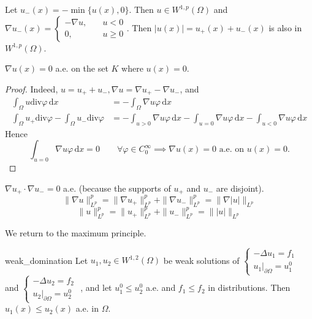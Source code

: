 \documentclass{report}
\begin{document}
\begin{corollary}{}{}
    Let \(u_{-}(x) = -\min\{u(x), 0\}\). Then \(u \in W^{1, p}(\Omega)\) and \(\nabla u_{-}(x) = \left\{\begin{aligned}
        -\nabla u, & \quad u < 0 \\
        0, & \quad u \geq 0
    \end{aligned}\right.\).
    Then \(\vert u(x) \vert = u_{+}(x) + u_{-}(x)\) is also in \(W^{1, p}(\Omega)\).
\end{corollary}

\begin{corollary}{}{}
    \(\nabla u(x) = 0\) a.e. on the set \(K\) where \(u(x) = 0\).
\end{corollary}

\begin{proof}
    Indeed, \(u = u_{+} + u_{-}, \nabla u = \nabla u_{+} - \nabla u_{-}\), and 
    \begin{align*}
        \int_{\Omega} u \text{div} \varphi \,\mathrm{d}x &= - \int_{\Omega} \nabla u \varphi \,\mathrm{d}x \\
        \int_{\Omega} u_{+} \text{div} \varphi - \int_{\Omega} u_{-} \text{div} \varphi &= - \int_{u > 0} \nabla u \varphi \,\mathrm{d}x - \int_{u = 0} \nabla u \varphi \,\mathrm{d}x - \int_{u < 0} \nabla u \varphi \,\mathrm{d}x
    \end{align*}
    Hence 
    \[
        \int_{u = 0} \nabla u \varphi \,\mathrm{d}x = 0 \qquad \forall \varphi \in C^{\infty}_{0} \implies \nabla u(x) = 0 \text{ a.e. on } u(x) = 0.
    \]
\end{proof}

\begin{corollary}{}{}
    \(\nabla u_{+} \cdot \nabla u_{-} = 0\) a.e. (because the supports of \(u_{+}\) and \(u_{-}\) are disjoint).
    \[
        \|\nabla u\|_{L^{p}}^{p} = \|\nabla u_{+}\|_{L^{p}}^{p} + \|\nabla u_{-}\|_{L^{p}}^{p} = \|\nabla \vert u \vert \|_{L^{p}}
    \] 
    \[
        \|u\|_{L^{p}}^{p} = \|u_{+}\|_{L^{p}}^{p} + \|u_{-}\|_{L^{p}}^{p} = \|\vert u \vert \|_{L^{p}}
    \]
\end{corollary}
We return to the maximum principle.

\begin{proposition}{}{weak_domination}
    Let \(u_{1}, u_{2} \in W^{1, 2}(\Omega)\) be weak solutions of 
    \(\begin{cases}
        -\Delta u_{1} = f_{1} \\
        \left. u_{1} \right|_{\partial \Omega} = u_{1}^{0}
    \end{cases}\) 
    and 
    \(\begin{cases}
        -\Delta u_{2} = f_{2} \\
        \left. u_{2} \right|_{\partial \Omega} = u_{2}^{0}
    \end{cases}\)
    , and let \(u_{1}^{0} \leq u_{2}^{0}\) a.e. and \(f_{1} \leq f_{2}\) in distributions. Then \(u_{1}(x) \leq u_{2}(x)\) a.e. in \(\Omega\).
\end{proposition}
\end{document}
